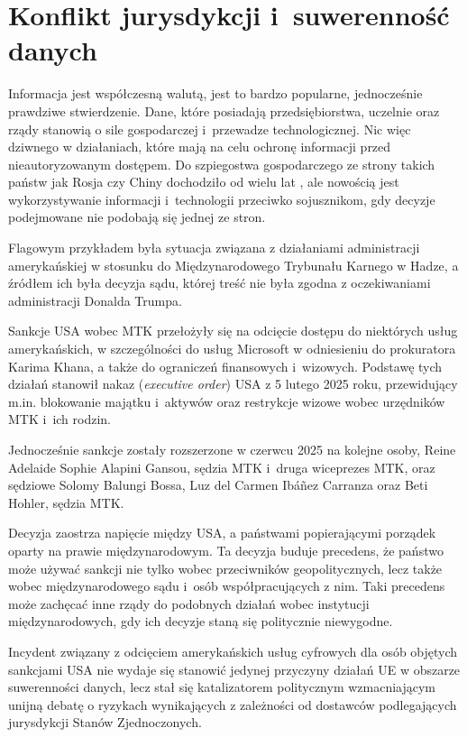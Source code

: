 \chapter{Konflikt jurysdykcji i~suwerenność danych}

Informacja jest współczesną walutą, jest to bardzo popularne, jednocześnie prawdziwe stwierdzenie. Dane, które posiadają przedsiębiorstwa, uczelnie oraz rządy stanowią o sile gospodarczej i~przewadze technologicznej. Nic więc dziwnego w działaniach, które mają na celu ochronę informacji przed nieautoryzowanym dostępem.
Do szpiegostwa gospodarczego ze strony takich państw jak Rosja czy Chiny dochodziło od wielu lat \autocite{putter2023espionage}, ale nowością jest wykorzystywanie informacji i~technologii przeciwko sojusznikom, gdy decyzje podejmowane nie podobają się jednej ze stron.

Flagowym przykładem była sytuacja związana z działaniami administracji amerykańskiej w stosunku do Międzynarodowego Trybunału Karnego w Hadze, a źródłem ich była decyzja sądu, której treść nie była zgodna z oczekiwaniami administracji Donalda Trumpa.

Sankcje USA wobec MTK przełożyły się na odcięcie dostępu do niektórych usług amerykańskich, w szczególności do usług Microsoft w odniesieniu do prokuratora Karima Khana, a także do ograniczeń finansowych i~wizowych. Podstawę tych działań stanowił nakaz (\textit{executive order}) USA z 5 lutego 2025 roku, przewidujący m.in. blokowanie majątku i~aktywów oraz restrykcje wizowe wobec urzędników MTK i~ich rodzin. \autocite{whitehouse_icc_sanctions_2025}

Jednocześnie sankcje zostały rozszerzone w czerwcu 2025 na kolejne osoby, Reine Adelaide Sophie Alapini Gansou, sędzia MTK i~druga wiceprezes MTK, oraz sędziowe Solomy Balungi Bossa, Luz del Carmen Ibáñez Carranza oraz Beti Hohler, sędzia MTK.

Decyzja zaostrza napięcie między USA, a państwami popierającymi porządek oparty na prawie międzynarodowym. Ta decyzja buduje precedens, że państwo może używać sankcji nie tylko wobec przeciwników geopolitycznych, lecz także wobec międzynarodowego sądu i~osób współpracujących z nim. Taki precedens może zachęcać inne rządy do podobnych działań wobec instytucji międzynarodowych, gdy ich decyzje staną się politycznie niewygodne.

Incydent związany z odcięciem amerykańskich usług cyfrowych dla osób objętych sankcjami USA nie wydaje się stanowić jedynej przyczyny działań UE w obszarze suwerenności danych, lecz stał się katalizatorem politycznym wzmacniającym unijną debatę o ryzykach wynikających z zależności od dostawców podlegających jurysdykcji Stanów Zjednoczonych.

